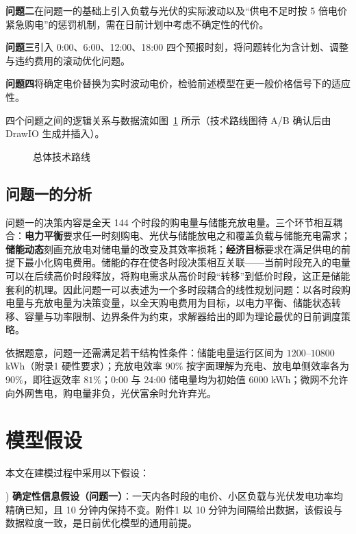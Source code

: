 \documentclass[zihao=-4,a4paper,UTF8,fontset=none]{ctexart}
\begin{document}
\textbf{问题二}在问题一的基础上引入负载与光伏的实际波动以及“供电不足时按 5 倍电价紧急购电”的惩罚机制，需在日前计划中考虑不确定性的代价。

\textbf{问题三}引入 0:00、6:00、12:00、18:00 四个预报时刻，将问题转化为含计划、调整与违约费用的滚动优化问题。

\textbf{问题四}将确定电价替换为实时波动电价，检验前述模型在更一般价格信号下的适应性。

四个问题之间的逻辑关系与数据流如图~\ref{fig:roadmap} 所示（技术路线图待 A/B 确认后由 DrawIO 生成并插入）。

\begin{figure}[H]
  \centering
  \caption{总体技术路线}
  \label{fig:roadmap}
\end{figure}

\subsection{问题一的分析}

问题一的决策内容是全天 144 个时段的购电量与储能充放电量。三个环节相互耦合：\textbf{电力平衡}要求任一时刻购电、光伏与储能放电之和覆盖负载与储能充电需求；\textbf{储能动态}刻画充放电对储电量的改变及其效率损耗；\textbf{经济目标}要求在满足供电的前提下最小化购电费用。储能的存在使各时段决策相互关联——当前时段充入的电量可以在后续高价时段释放，将购电需求从高价时段“转移”到低价时段，这正是储能套利的机理。因此问题一可以表述为一个多时段耦合的线性规划问题：以各时段购电量与充放电量为决策变量，以全天购电费用为目标，以电力平衡、储能状态转移、容量与功率限制、边界条件为约束，求解器给出的即为理论最优的日前调度策略。

依据题意，问题一还需满足若干结构性条件：储能电量运行区间为 $1200$--$10800$ kWh（附录1 硬性要求）；充放电效率 $90\%$ 按字面理解为充电、放电单侧效率各为 $90\%$，即往返效率 $81\%$；0:00 与 24:00 储电量均为初始值 $6000$ kWh；微网不允许向外网售电，购电量非负，光伏富余时允许弃光。

\section{模型假设}

本文在建模过程中采用以下假设：

) \textbf{确定性信息假设（问题一）}：一天内各时段的电价、小区负载与光伏发电功率均精确已知，且 10 分钟内保持不变。附件1 以 10 分钟为间隔给出数据，该假设与数据粒度一致，是日前优化模型的通用前提。
\end{document}
